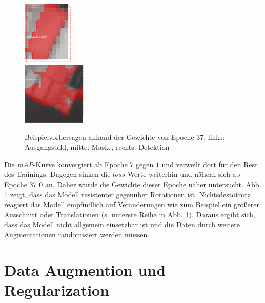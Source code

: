 \begin{figure}[ht]
\begin{minipage}[c]{.3\textwidth}
  \\ \vspace{.25cm}
  \includegraphics[height=3cm]{pics/pred-2-3.png}
  \\ \vspace{.25cm}
  \includegraphics[height=3cm]{pics/pred-2-4.png}
  \end{minipage}

  \caption[Beispielvorhersagen Experiment 2]{Beispielvorhersagen anhand der Gewichte von Epoche 37, links: Ausgangsbild, mitte: Maske, rechts: Detektion}
  \label{fig:pred-2}
\end{figure}
\noindent
Die \textit{mAP}-Kurve konvergiert ab Epoche 7 gegen $1$ und verweilt dort für den Rest des Trainings. Dagegen sinken die $loss$-Werte weiterhin und nähern sich ab Epoche 37 $0$ an. Daher wurde die Gewichte dieser Epoche näher untersucht. Abb. \ref{fig:pred-2} zeigt, dass das Modell resistenter gegenüber Rotationen ist. Nichtsdestotrotz reagiert das Modell empfindlich auf Veränderungen wie zum Beispiel ein größerer Ausschnitt oder Translationen (s. unterste Reihe in Abb. \ref{fig:pred-2}). Daraus ergibt sich, dass das Modell nicht allgemein einsetzbar ist und die Daten durch weitere Augmentationen randomisiert werden müssen.
\newpage
\section{Data Augmention und Regularization}\label{sec:experiment-3}

